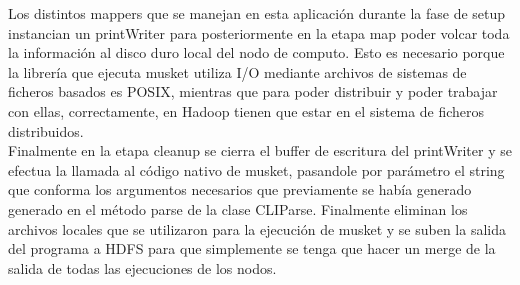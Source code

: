 \documentclass[conference]{IEEEtran}
\begin{document}
Los distintos mappers que se manejan en esta aplicación durante la fase de setup instancian un printWriter para posteriormente en la etapa map poder volcar toda la información al disco duro local del nodo de computo. Esto es necesario porque la librería que ejecuta musket utiliza I/O mediante archivos de sistemas de ficheros basados es POSIX, mientras que para poder distribuir y poder trabajar con ellas, correctamente, en Hadoop tienen que estar en el sistema de ficheros distribuidos.\\
Finalmente en la etapa cleanup se cierra el buffer de escritura del printWriter y se efectua la llamada al código nativo de musket, pasandole por parámetro el string que conforma los argumentos necesarios que previamente se había generado generado en el método parse de la clase CLIParse. Finalmente eliminan los archivos locales que se utilizaron para la ejecución de musket y se suben la salida del programa a HDFS para que simplemente se tenga que hacer un merge de la salida de todas las ejecuciones de los nodos.

\end{document}
